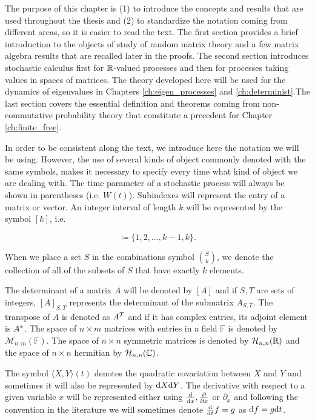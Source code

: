 The purpose of this chapter is (1) to introduce the concepts and results that are used throughout the thesis and (2) to standardize the notation coming from different areas, so it is easier to read the text. The first section provides a brief introduction to the objects of study of random matrix theory and a few matrix algebra results that are recalled later in the proofs. The second section introduces stochastic calculus first for $\mathbb R$-valued processes and then for processes taking values in spaces of matrices. The theory developed here will be used for the dynamics of eigenvalues in Chapters \ref{ch:eigen_processes} and \ref{ch:determinist}.The last section covers the essential definition and theorems coming from non-commutative probability theory that constitute a precedent for Chapter \ref{ch:finite_free}.

In order to be consistent along the text, we introduce here the notation we will be using. However, the use of several kinds of object commonly denoted with the same symbols, makes it necessary to specify every time what kind of object we are dealing with. The time parameter of a stochastic process will always be shown in parentheses (i.e. $W(t)$). Subindexes will represent the entry of a matrix or vector. An integer interval of length $k$ will be represented by the symbol $[k]$, i.e.

\begin{equation*}
    [k] \coloneqq \{1,2,\dots, k-1, k\}.
\end{equation*}

When we place a set $S$ in the combinations symbol $\binom{S}{k}$, we denote the collection of all of the subsets of $S$ that have exactly $k$ elements. 

The determinant of a matrix $A$ will be denoted by $[A]$ and if $S,T$ are sets of integers, $[A]_{S,T}$ represents the determinant of the submatrix $A_{S,T}$. The transpose of $A$ is denoted as $A^T$ and if it has complex entries, its adjoint element is $A^*$. The space of $n\times m$ matrices with entries in a field $\mathbb F$ is denoted by $\mathcal M_{n,m}(\mathbb F)$. The space of $n\times n$ symmetric matrices is denoted by $\mathcal H_{n,n}(\mathbb R)$ and the space of $n\times n$ hermitian by $\mathcal H_{n,n}(\mathbb C)$.

The symbol $\langle X,Y \rangle(t)$ denotes the quadratic covariation between $X$ and $Y$ and sometimes it will also be represented by $\mathrm d X\mathrm d Y$. The derivative with respect to a given variable $x$ will be represented either using $\frac{\mathrm d}{\mathrm d x}, \frac{\partial}{\partial x}$ or $\partial_x$ and following the convention in the literature we will sometimes denote $\frac{\mathrm d}{\mathrm d t} f = g$ as $\mathrm d f = g\mathrm d t$.


